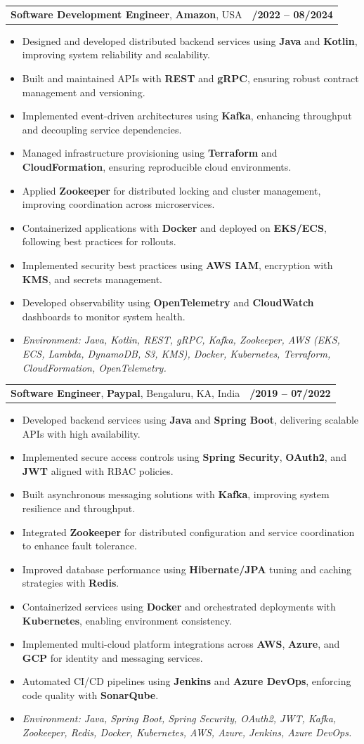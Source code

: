 \documentclass[letterpaper,11pt]{article}
\makeatletter
\newcommand{\resumeItem}[1]{
  \item\footnotesize{
    {#1 \vspace{-2pt}}
  }
}
\newcommand{\resumeSubheading}[4]{
  \vspace{-2pt}\item
    \begin{tabular*}{1.0\textwidth}[t]{l@{\extracolsep{\fill}}r}
      \textbf{\fontsize{10pt}{14pt}\selectfont #3}, \textbf{\fontsize{10pt}{14pt}\selectfont #1}, \fontsize{10pt}{14pt}\selectfont #4 & \textbf{\fontsize{10pt}{14pt}\selectfont #2} \\
    \end{tabular*}\vspace{-7pt}
}
\newcommand{\resumeItemListStart}{\begin{itemize}[leftmargin=*]}
\newcommand{\resumeItemListEnd}{\end{itemize}\vspace{-5pt}}
\makeatother
\begin{document}
\resumeSubheading
{Amazon}{10/2022 -- 08/2024}
{Software Development Engineer}{USA}
\resumeItemListStart
  \resumeItem{Designed and developed distributed backend services using \textbf{Java} and \textbf{Kotlin}, improving system reliability and scalability.}
  \resumeItem{Built and maintained APIs with \textbf{REST} and \textbf{gRPC}, ensuring robust contract management and versioning.}
  \resumeItem{Implemented event-driven architectures using \textbf{Kafka}, enhancing throughput and decoupling service dependencies.}
  \resumeItem{Managed infrastructure provisioning using \textbf{Terraform} and \textbf{CloudFormation}, ensuring reproducible cloud environments.}
  \resumeItem{Applied \textbf{Zookeeper} for distributed locking and cluster management, improving coordination across microservices.}
  \resumeItem{Containerized applications with \textbf{Docker} and deployed on \textbf{EKS/ECS}, following best practices for rollouts.}
  \resumeItem{Implemented security best practices using \textbf{AWS IAM}, encryption with \textbf{KMS}, and secrets management.}
  \resumeItem{Developed observability using \textbf{OpenTelemetry} and \textbf{CloudWatch} dashboards to monitor system health.}
  \resumeItem{\textit{Environment: Java, Kotlin, REST, gRPC, Kafka, Zookeeper, AWS (EKS, ECS, Lambda, DynamoDB, S3, KMS), Docker, Kubernetes, Terraform, CloudFormation, OpenTelemetry.}}
\resumeItemListEnd

\resumeSubheading
{Paypal}{08/2019 -- 07/2022}
{Software Engineer}{Bengaluru, KA, India}
\resumeItemListStart
  \resumeItem{Developed backend services using \textbf{Java} and \textbf{Spring Boot}, delivering scalable APIs with high availability.}
  \resumeItem{Implemented secure access controls using \textbf{Spring Security}, \textbf{OAuth2}, and \textbf{JWT} aligned with RBAC policies.}
  \resumeItem{Built asynchronous messaging solutions with \textbf{Kafka}, improving system resilience and throughput.}
  \resumeItem{Integrated \textbf{Zookeeper} for distributed configuration and service coordination to enhance fault tolerance.}
  \resumeItem{Improved database performance using \textbf{Hibernate/JPA} tuning and caching strategies with \textbf{Redis}.}
  \resumeItem{Containerized services using \textbf{Docker} and orchestrated deployments with \textbf{Kubernetes}, enabling environment consistency.}
  \resumeItem{Implemented multi-cloud platform integrations across \textbf{AWS}, \textbf{Azure}, and \textbf{GCP} for identity and messaging services.}
  \resumeItem{Automated CI/CD pipelines using \textbf{Jenkins} and \textbf{Azure DevOps}, enforcing code quality with \textbf{SonarQube}.}
  \resumeItem{\textit{Environment: Java, Spring Boot, Spring Security, OAuth2, JWT, Kafka, Zookeeper, Redis, Docker, Kubernetes, AWS, Azure, Jenkins, Azure DevOps.}}
\resumeItemListEnd
\end{document}

